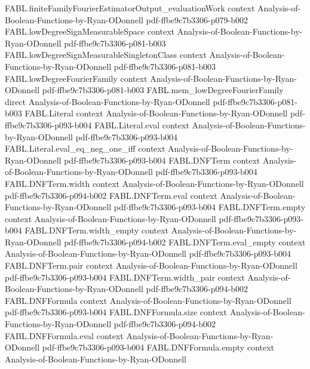 \begin{theorem}
  {FABL.finiteFamilyFourierEstimatorOutput_evaluationWork}
  {context}
  {Analysis-of-Boolean-Functions-by-Ryan-ODonnell}
  {pdf-ffbe9c7b3306-p079-b002}
\proofstep
  {FABL.lowDegreeSignMeasurableSpace}
  {context}
  {Analysis-of-Boolean-Functions-by-Ryan-ODonnell}
  {pdf-ffbe9c7b3306-p081-b003}
\proofstep
  {FABL.lowDegreeSignMeasurableSingletonClass}
  {context}
  {Analysis-of-Boolean-Functions-by-Ryan-ODonnell}
  {pdf-ffbe9c7b3306-p081-b003}
\proofstep
  {FABL.lowDegreeFourierFamily}
  {context}
  {Analysis-of-Boolean-Functions-by-Ryan-ODonnell}
  {pdf-ffbe9c7b3306-p081-b003}
\proofstep
  {FABL.mem_lowDegreeFourierFamily}
  {direct}
  {Analysis-of-Boolean-Functions-by-Ryan-ODonnell}
  {pdf-ffbe9c7b3306-p081-b003}
\proofstep
  {FABL.Literal}
  {context}
  {Analysis-of-Boolean-Functions-by-Ryan-ODonnell}
  {pdf-ffbe9c7b3306-p093-b004}
\proofstep
  {FABL.Literal.eval}
  {context}
  {Analysis-of-Boolean-Functions-by-Ryan-ODonnell}
  {pdf-ffbe9c7b3306-p093-b004}
\proofstep
  {FABL.Literal.eval_eq_neg_one_iff}
  {context}
  {Analysis-of-Boolean-Functions-by-Ryan-ODonnell}
  {pdf-ffbe9c7b3306-p093-b004}
\proofstep
  {FABL.DNFTerm}
  {context}
  {Analysis-of-Boolean-Functions-by-Ryan-ODonnell}
  {pdf-ffbe9c7b3306-p093-b004}
\proofstep
  {FABL.DNFTerm.width}
  {context}
  {Analysis-of-Boolean-Functions-by-Ryan-ODonnell}
  {pdf-ffbe9c7b3306-p094-b002}
\proofstep
  {FABL.DNFTerm.eval}
  {context}
  {Analysis-of-Boolean-Functions-by-Ryan-ODonnell}
  {pdf-ffbe9c7b3306-p093-b004}
\proofstep
  {FABL.DNFTerm.empty}
  {context}
  {Analysis-of-Boolean-Functions-by-Ryan-ODonnell}
  {pdf-ffbe9c7b3306-p093-b004}
\proofstep
  {FABL.DNFTerm.width_empty}
  {context}
  {Analysis-of-Boolean-Functions-by-Ryan-ODonnell}
  {pdf-ffbe9c7b3306-p094-b002}
\proofstep
  {FABL.DNFTerm.eval_empty}
  {context}
  {Analysis-of-Boolean-Functions-by-Ryan-ODonnell}
  {pdf-ffbe9c7b3306-p093-b004}
\proofstep
  {FABL.DNFTerm.pair}
  {context}
  {Analysis-of-Boolean-Functions-by-Ryan-ODonnell}
  {pdf-ffbe9c7b3306-p093-b004}
\proofstep
  {FABL.DNFTerm.width_pair}
  {context}
  {Analysis-of-Boolean-Functions-by-Ryan-ODonnell}
  {pdf-ffbe9c7b3306-p094-b002}
\proofstep
  {FABL.DNFFormula}
  {context}
  {Analysis-of-Boolean-Functions-by-Ryan-ODonnell}
  {pdf-ffbe9c7b3306-p093-b004}
\proofstep
  {FABL.DNFFormula.size}
  {context}
  {Analysis-of-Boolean-Functions-by-Ryan-ODonnell}
  {pdf-ffbe9c7b3306-p094-b002}
\proofstep
  {FABL.DNFFormula.eval}
  {context}
  {Analysis-of-Boolean-Functions-by-Ryan-ODonnell}
  {pdf-ffbe9c7b3306-p093-b004}
\proofstep
  {FABL.DNFFormula.empty}
  {context}
  {Analysis-of-Boolean-Functions-by-Ryan-ODonnell}

\end{theorem}
